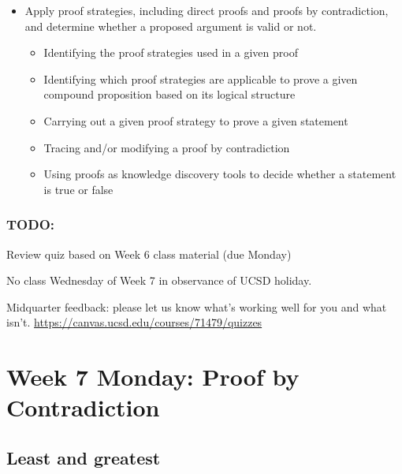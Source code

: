\begin{itemize}
\item Apply proof strategies, including direct proofs and proofs by contradiction, and determine whether a proposed argument is valid or not.
\begin{itemize}
    \item Identifying the proof strategies used in a given proof
    \item Identifying which proof strategies are applicable to prove a given compound proposition based on its logical structure
    \item Carrying out a given proof strategy to prove a given statement
    \item Tracing and/or modifying a proof by contradiction
    \item Using proofs as knowledge discovery tools to decide whether a statement is true or false
\end{itemize}

\end{itemize}

\subsubsection*{TODO:}
\begin{list}
   {\itemsep2pt}
    \item Review quiz based on Week 6 class material (due Monday)
    \item No class Wednesday of Week 7 in observance of UCSD holiday.
    \item Midquarter feedback: please let us know what's working well for you and what isn't.  \url{https://canvas.ucsd.edu/courses/71479/quizzes}
\end{list}

\newpage


\section*{Week 7 Monday: Proof by Contradiction}

\subsection*{Least and greatest}







